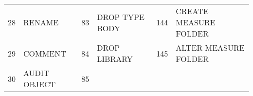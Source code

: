\begin{longtable}[]{@{}llllll@{}}
\begin{minipage}[t]{0.06\columnwidth}\raggedright\strut
28\strut
\end{minipage} & \begin{minipage}[t]{0.19\columnwidth}\raggedright\strut
RENAME\strut
\end{minipage} & \begin{minipage}[t]{0.06\columnwidth}\raggedright\strut
83\strut
\end{minipage} & \begin{minipage}[t]{0.24\columnwidth}\raggedright\strut
DROP TYPE BODY\strut
\end{minipage} & \begin{minipage}[t]{0.06\columnwidth}\raggedright\strut
144\strut
\end{minipage} & \begin{minipage}[t]{0.24\columnwidth}\raggedright\strut
CREATE MEASURE FOLDER\strut
\end{minipage}\tabularnewline
\begin{minipage}[t]{0.06\columnwidth}\raggedright\strut
29\strut
\end{minipage} & \begin{minipage}[t]{0.19\columnwidth}\raggedright\strut
COMMENT\strut
\end{minipage} & \begin{minipage}[t]{0.06\columnwidth}\raggedright\strut
84\strut
\end{minipage} & \begin{minipage}[t]{0.24\columnwidth}\raggedright\strut
DROP LIBRARY\strut
\end{minipage} & \begin{minipage}[t]{0.06\columnwidth}\raggedright\strut
145\strut
\end{minipage} & \begin{minipage}[t]{0.24\columnwidth}\raggedright\strut
ALTER MEASURE FOLDER\strut
\end{minipage}\tabularnewline
\begin{minipage}[t]{0.06\columnwidth}\raggedright\strut
30\strut
\end{minipage} & \begin{minipage}[t]{0.19\columnwidth}\raggedright\strut
AUDIT OBJECT\strut
\end{minipage} & \begin{minipage}[t]{0.06\columnwidth}\raggedright\strut
85\strut
\end{minipage} & \begin{minipage}[t]{0.24\columnwidth}\raggedright\strut

\end{minipage}
\end{longtable}
